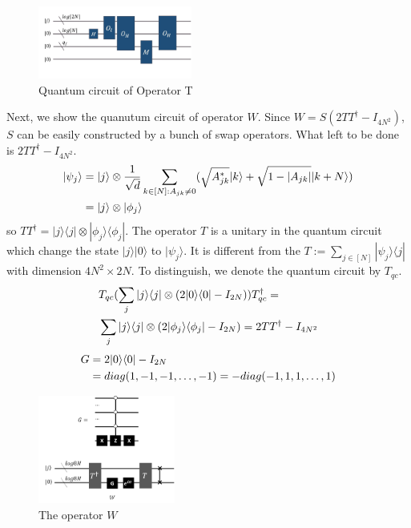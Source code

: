 \documentclass[%
 reprint,
 amsmath,amssymb,
pra,
]{revtex4-1}
\begin{document}
\begin{figure}[h]
\centering
\includegraphics[width=0.45\textwidth]{Fig/T}
\caption{Quantum circuit of Operator T}
\label{T}
\end{figure}

Next, we show the quanutum circuit of operator $W$. Since $W=S(2TT^\dagger-I_{4N^2})$, $S$ can be easily constructed by a bunch of swap operators.
What left to be done is $2TT^\dagger-I_{4N^2}$. 
\begin{align}
|\psi_j\rangle&=|j\rangle\otimes\frac{1}{\sqrt{d}} 
\sum_{k\in [N]:A_{jk}\neq 0}(\sqrt{A^*_{jk}}|k\rangle+\sqrt{1-|A_{jk}|}|k+N
\rangle)\notag\\
&=|j\rangle\otimes|\phi_j\rangle\notag
\end{align}
so $TT^\dagger=|j\rangle\langle j|\otimes|\phi_j\rangle\langle\phi_j|$.
The operator $T$ is a unitary in the quantum circuit which change
the state $|j\rangle|0\rangle$ to $|\psi_j\rangle$. It is different from the
$T:=\sum_{j\in[N]}|\psi_j\rangle\langle j|$ with dimension $4N^2\times2N$.
To distinguish, we denote the quantum circuit by $T_{qc}$.
\begin{align}
&T_{qc}(\sum_j|j\rangle\langle j|\otimes(2|0\rangle\langle0|-I_{2N}))
T_{qc}^\dagger=\notag\\
&\sum_j|j\rangle\langle j|\otimes
(2|\phi_j\rangle\langle \phi_j|-I_{2N})=2TT^\dagger-I_{4N^2}\notag
\end{align}
\begin{align}
G&=2|0\rangle\langle0|-I_{2N}\notag \\
&=diag(1,-1,-1,\dots,-1)=-diag(-1,1,1,\dots,1)\notag
\end{align}
\begin{figure}[htbp]
\centering
\includegraphics[width=0.4\textwidth]{Fig/WW}
\caption{The operator $W$}
\label{W}
\end{figure}
\end{document}
